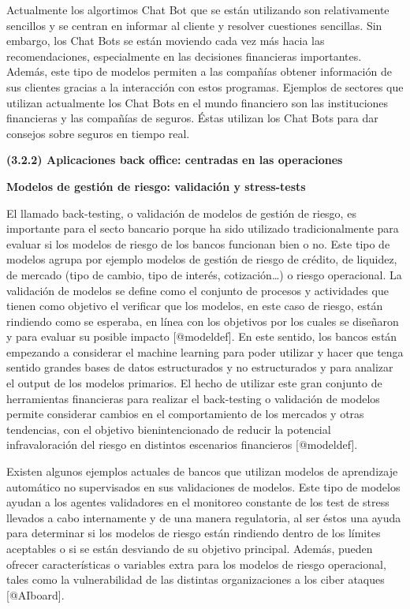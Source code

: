 \documentclass[]{article}
\begin{document}
Actualmente los algortimos Chat Bot que se están utilizando son
relativamente sencillos y se centran en informar al cliente y resolver
cuestiones sencillas. Sin embargo, los Chat Bots se están moviendo cada
vez más hacia las recomendaciones, especialmente en las decisiones
financieras importantes. Además, este tipo de modelos permiten a las
compañías obtener información de sus clientes gracias a la interacción
con estos programas. Ejemplos de sectores que utilizan actualmente los
Chat Bots en el mundo financiero son las instituciones financieras y las
compañías de seguros. Éstas utilizan los Chat Bots para dar consejos
sobre seguros en tiempo real.

\setlength\parskip{5ex}

\textbf{(3.2.2) Aplicaciones back office: centradas en las operaciones}

\textbf{Modelos de gestión de riesgo: validación y stress-tests}

El llamado back-testing, o validación de modelos de gestión de riesgo,
es importante para el secto bancario porque ha sido utilizado
tradicionalmente para evaluar si los modelos de riesgo de los bancos
funcionan bien o no. Este tipo de modelos agrupa por ejemplo modelos de
gestión de riesgo de crédito, de liquidez, de mercado (tipo de cambio,
tipo de interés, cotización\ldots{}) o riesgo operacional. La validación
de modelos se define como el conjunto de procesos y actividades que
tienen como objetivo el verificar que los modelos, en este caso de
riesgo, están rindiendo como se esperaba, en línea con los objetivos por
los cuales se diseñaron y para evaluar su posible impacto
{[}@modeldef{]}. En este sentido, los bancos están empezando a
considerar el machine learning para poder utilizar y hacer que tenga
sentido grandes bases de datos estructurados y no estructurados y para
analizar el output de los modelos primarios. El hecho de utilizar este
gran conjunto de herramientas financieras para realizar el back-testing
o validación de modelos permite considerar cambios en el comportamiento
de los mercados y otras tendencias, con el objetivo bienintencionado de
reducir la potencial infravaloración del riesgo en distintos escenarios
financieros {[}@modeldef{]}.

\setlength\parskip{5ex}

Existen algunos ejemplos actuales de bancos que utilizan modelos de
aprendizaje automático no supervisados en sus validaciones de modelos.
Este tipo de modelos ayudan a los agentes validadores en el monitoreo
constante de los test de stress llevados a cabo internamente y de una
manera regulatoria, al ser éstos una ayuda para determinar si los
modelos de riesgo están rindiendo dentro de los límites aceptables o si
se están desviando de su objetivo principal. Además, pueden ofrecer
características o variables extra para los modelos de riesgo
operacional, tales como la vulnerabilidad de las distintas
organizaciones a los ciber ataques {[}@AIboard{]}.
\end{document}
